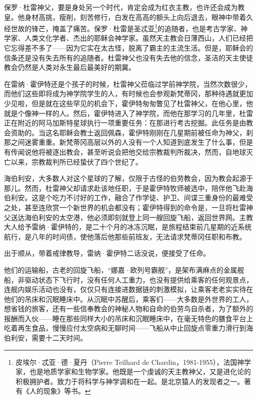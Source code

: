 \documentclass[AutoFakeBold=true]{book}
\begin{document}
保罗·杜雷神父，要是身处另一个时代，肯定会成为红衣主教，也许还会成为教皇。他身材高挑，瘦削，刻苦修行，白发在高高的额头上向后退去，眼神中带着久经世故的锋芒，掩盖了痛苦。保罗·杜雷是圣忒亚\footnote{皮埃尔·忒亚·德·夏丹（Pierre Teilhard de Chardin，1981-1955），法国神学家，也是地质学家和生物学家。他既是一个虔诚的天主教神父，又是进化论的积极拥护者。致力于将科学与神学调和在一起。是北京猿人的发现者之一。著有《人的现象》等书。}的追随者，也是考古学家、神学家、人类文化学者、杰出的耶稣会神学家。虽然天主教会日薄西山，人们已经把它忘得差不多了——因为它实在太古怪，脱离了霸主的主流生活。但是，耶稣会的信条还是没有失去所有的追随者。杜雷神父也没有失去他的信念，圣洁的天主使徒教会仍然是人类对永生最后最美好的期冀。

在雷纳·霍伊特还是个孩子的时候，杜雷神父莅临过学前神学院，当然次数很少，而他们这些即将成为神学院学生的人，有时候也会参观新梵蒂冈，那种待遇就更加少见啦，但是就在这些罕见的机会下，霍伊特匆匆瞥见了杜雷神父，在他心里，他就是个像神一样的人。然后，霍伊特进入了神学院，而他在那学习的几年里，杜雷正在附近的阿马加斯特星球执行一项重要任务：在那进行考古挖掘。此任务是由教会资助的。当这名耶稣会教士返回佩森，霍伊特刚刚在几星期前被任命为神父，刹那之间迷雾重重。新梵蒂冈高层以外的人没有一个人知道到底发生了什么事，但是有传闻说他将被逐出教会，甚至听说会把他交给宗教裁判所裁决，然而，自地球灭亡以来，宗教裁判所已经蛰伏了四个世纪了。

海伯利安，大多数人对这个星球的了解，仅限于古怪的伯劳教会，因为教会起源于那儿。然而，杜雷神父却请求赴该地任职，于是霍伊特牧师被选中，陪伴他飞赴海伯利安。这是个吃力不讨好的工作，融合了作学徒、护卫、间谍三重身份的最难受之处，甚至连欣赏一个新世界的机会都没有；霍伊特得到的命令是，一旦将杜雷神父送达海伯利安的太空港，他必须即刻就登上同一艘回旋飞船，返回世界网。主教大人给予雷纳·霍伊特的，是二十个月的冰冻沉眠，是旅程结束前几星期的近系统航行，是八年的时间债，使他落后他那些前班友，无法请求梵蒂冈任职和布教。

出于顺从，带着戒律教导，雷纳·霍伊特二话没说，便接受了任命。

他们的运输船，古老的回旋飞船，``娜嘉·欧列号霸舰''，是架布满麻点的金属舰船，非驱动状态下飞行时，没有任何人工重力，也没有提供给乘客的任何观景点，连舰内娱乐活动也没有，仅仅只有连接进数据链的刺激模拟，让乘客老老实实待在他们的吊床和沉眠睡床中。从沉眠中苏醒后，乘客们——大多数是外世界的工人，想省钱的旅客，还有一些信奉教会的神秘人物和自命的伯劳鸟自杀者，为了额外的报酬而入伙——睡在那些同样大小的吊床和沉眠睡床中，在毫无特色的膳食平台上吃着再生食品，慢慢应付太空病和无聊时间——飞船从中止回旋点零重力滑行到海伯利安，需要十二天时间。
\end{document}
